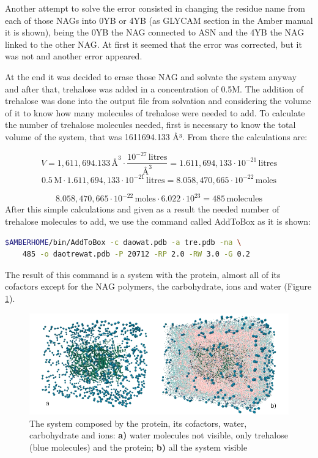 \documentclass[a4paper]{article}
\begin{document}
Another attempt to solve the error consisted in changing the residue name from each of those NAGs into 0YB or 4YB (as GLYCAM section in the Amber manual it is shown), being the 0YB the NAG connected to ASN and the 4YB the NAG linked to the other NAG. At first it seemed that the error was corrected, but it was not and another error appeared.

At the end it was decided to erase those NAG and solvate the system anyway and after that, trehalose was added in a concentration of 0.5M. The addition of trehalose was done into the output file from solvation and considering the volume of it to know how many molecules of trehalose were needed to add. To calculate the number of trehalose molecules needed, first is necessary to know the total volume of the system, that was 1611694.133 Å³. From there the calculations are:

\[
V = 1,611,694.133 \, \text{\AA}^3 \cdot \frac{10^{-27} \, \mathrm{litres}}{\text{\AA}^3}= 1.611,694,133 \cdot 10^{-21} \, \mathrm{litres}
\]
\[
0.5\, \mathrm{M} \cdot 1.611,694,133 \cdot 10^{-21} \, \mathrm{litres} = 8.058,470,665 \cdot 10^{-22}\,  \mathrm{moles}
\]

\[
8.058,470,665 \cdot 10^{-22}\,  \mathrm{moles} \cdot 6.022 \cdot 10^{23} = 485 \, \mathrm{molecules}
\]
After this simple calculations and given as a result the needed number of trehalose molecules to add, we use the command called AddToBox as it is shown:

\begin{lstlisting}[language=Bash,caption={AddToBox command}]
    $AMBERHOME/bin/AddToBox -c daowat.pdb -a tre.pdb -na \
    485 -o daotrewat.pdb -P 20712 -RP 2.0 -RW 3.0 -G 0.2
\end{lstlisting}

The result of this command is a system with the protein, almost all of its cofactors except for the NAG polymers, the carbohydrate, ions and water (Figure \ref{fig:daotrewat}).

\begin{figure}[h]
    \centering
    \includegraphics[width = \linewidth]{./figures/daotrewat}
    \caption{The system composed by the protein, its cofactors, water, carbohydrate and ions: \textbf{a)} water molecules not visible, only trehalose (blue molecules) and the protein; \textbf{b)} all the system visible}
    \label{fig:daotrewat}
\end{figure}
\end{document}
